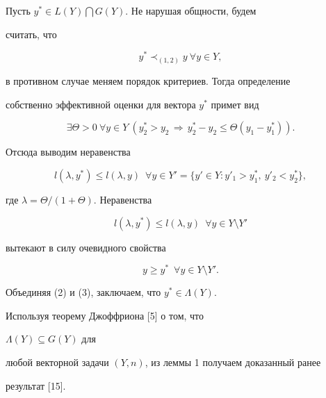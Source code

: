 \begin{pf} Пусть $y^*\in L(Y)\bigcap G(Y)$. Не нарушая общности, будем 


считать, что 


$$ 


y^*\prec_{(1,2)}y\ \forall y\in Y, 


$$ 


в противном случае меняем порядок критериев. Тогда определение 


собственно эффективной оценки для вектора $y^*$ примет вид 


$$ 


\exists\Theta>0\ \forall y\in Y\ (y^*_2>y_2\,\Longrightarrow\, 


y^*_2-y_2\le\Theta(y_1-y^*_1)). 


$$ 


Отсюда выводим неравенства 


\begin{equation} 


l(\lambda,y^*)\le l(\lambda,y)\ \;\forall y\in Y'= 


\{y'\in Y:y'_1>y^*_1,\ y'_2<y^*_2\}, 


\end{equation} 


где $\lambda=\Theta/(1+\Theta)$. Неравенства 


\begin{equation} 


l(\lambda,y^*)\le l(\lambda,y)\ \;\forall y\in Y\setminus Y' 


\end{equation} 


вытекают в силу очевидного свойства 


$$ 


y\ge y^*\ \;\forall y\in Y\setminus Y'. 


$$ 


Объединяя (2) и (3), заключаем, что $y^*\in\Lambda(Y)$. 


\end{pf} 


 


Используя теорему Джоффриона [5] о том, что 


$\Lambda(Y)\subseteq G(Y)$ для 


любой векторной задачи $(Y,n)$, из леммы 1 получаем доказанный ранее 


результат [15]. 


 


